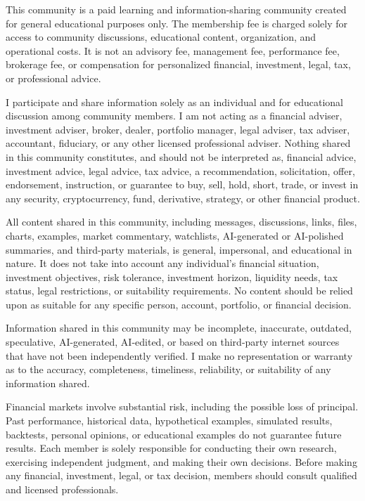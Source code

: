 \documentclass[11pt]{ctexart}
\begin{document}
{\scriptsize\color{refgray}
This community is a paid learning and information-sharing community created for general educational purposes only. The membership fee is charged solely for access to community discussions, educational content, organization, and operational costs. It is not an advisory fee, management fee, performance fee, brokerage fee, or compensation for personalized financial, investment, legal, tax, or professional advice.\par
I participate and share information solely as an individual and for educational discussion among community members. I am not acting as a financial adviser, investment adviser, broker, dealer, portfolio manager, legal adviser, tax adviser, accountant, fiduciary, or any other licensed professional adviser. Nothing shared in this community constitutes, and should not be interpreted as, financial advice, investment advice, legal advice, tax advice, a recommendation, solicitation, offer, endorsement, instruction, or guarantee to buy, sell, hold, short, trade, or invest in any security, cryptocurrency, fund, derivative, strategy, or other financial product.\par
All content shared in this community, including messages, discussions, links, files, charts, examples, market commentary, watchlists, AI-generated or AI-polished summaries, and third-party materials, is general, impersonal, and educational in nature. It does not take into account any individual's financial situation, investment objectives, risk tolerance, investment horizon, liquidity needs, tax status, legal restrictions, or suitability requirements. No content should be relied upon as suitable for any specific person, account, portfolio, or financial decision.\par
Information shared in this community may be incomplete, inaccurate, outdated, speculative, AI-generated, AI-edited, or based on third-party internet sources that have not been independently verified. I make no representation or warranty as to the accuracy, completeness, timeliness, reliability, or suitability of any information shared.\par
Financial markets involve substantial risk, including the possible loss of principal. Past performance, historical data, hypothetical examples, simulated results, backtests, personal opinions, or educational examples do not guarantee future results. Each member is solely responsible for conducting their own research, exercising independent judgment, and making their own decisions. Before making any financial, investment, legal, or tax decision, members should consult qualified and licensed professionals.\par
}
\end{document}
